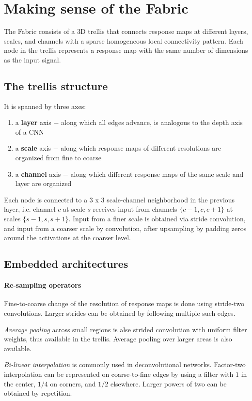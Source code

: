 \documentclass[a4paper,twocolumn]{article}
\begin{document}
\section{Making sense of the Fabric}
The Fabric consists of a 3D trellis that connects response maps at different layers, scales, and channels with a sparse homogeneous local connectivity pattern.
Each node in the trellis represents a response map with the same number of dimensions as the input signal.

\subsection{The trellis structure}
It is spanned by three axes:
\begin{enumerate}
    \item a \textbf{layer} axis $-$ along which all edges advance, is analogous to the depth axis of a CNN
    \item a \textbf{scale} axis $-$ along which response maps of different resolutions are organized from fine to coarse
    \item a \textbf{channel} axis $-$ along which different response maps of the same scale and layer are organized
\end{enumerate}

Each node is connected to a 3 x 3 scale-channel neighborhood in the previous layer, i.e. channel $c$ at scale $s$ receives input from channels $\{c-1, c, c+1\}$ at scales $\{s-1, s, s+1\}$. Input from a finer scale is obtained via stride convolution, and input from a coarser scale by convolution, after upsampling by padding zeros around the activations at the coarser level.

\subsection{Embedded architectures}
\paragraph{Re-sampling operators}
Fine-to-coarse change of the resolution of response maps is done using stride-two convolutions. Larger strides can be obtained by following multiple such edges.

\textit{Average pooling} across small regions is alse strided convolution with uniform filter weights, thus available in the trellis. Average pooling over larger areas is also available.

\textit{Bi-linear interpolation} is commonly used in deconvolutional networks. Factor-two interpolation can be represented on coarse-to-fine edges by using a filter with $1$ in the center, $1/4$ on corners, and $1/2$ elsewhere. Larger powers of two can be obtained by repetition.
\end{document}
